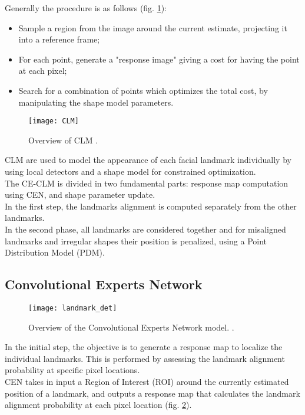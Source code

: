Generally the procedure is as follows (fig. \ref{fig:CLM}):
\begin{itemize}[noitemsep]
	\item Sample a region from the image around the current estimate, projecting it into a reference frame;
	\item For each point, generate a "response image" giving a cost for having the point at each pixel;
	\item Search for a combination of points which optimizes the total cost, by manipulating the shape model parameters.
\end{itemize}

\begin{figure}[H]
	\centering
	\texttt{[image: CLM]}
	\caption{Overview of CLM \cite{clm_cootes}.}
	\label{fig:CLM}
\end{figure}

CLM are used to model the appearance of each facial landmark individually by using local detectors and a shape model for constrained optimization. \\
The CE-CLM is divided in two fundamental parts: response map computation using CEN, and shape parameter update.\\
In the first step, the landmarks alignment is computed separately from the other landmarks. \\
In the second phase, all landmarks are considered together and for misaligned landmarks and irregular shapes their position is penalized, using a Point Distribution Model (PDM).

\subsection{Convolutional Experts Network}
\begin{figure}[H]
	\centering
	\texttt{[image: landmark\_det]}
	\caption{Overview of the Convolutional Experts Network model. \cite{Baltru2017}.}
	\label{fig:landmark_det}
\end{figure}
In the initial step, the objective is to generate a response map to localize the individual landmarks. This is performed by assessing the landmark alignment probability at specific pixel locations. \\
CEN takes in input a Region of Interest (ROI) around the currently estimated position of a landmark, and outputs a response map that calculates the landmark alignment probability at each pixel location (fig. \ref{fig:landmark_det}).

